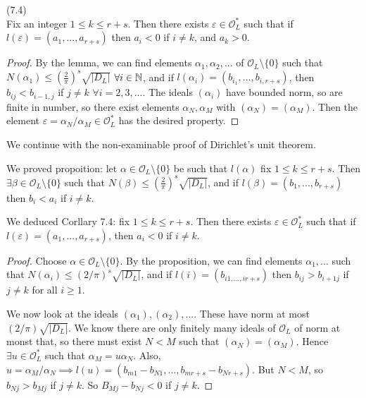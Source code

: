 \documentclass[a4paper]{article}
\begin{document}
\begin{coro} (7.4)\\
Fix an integer $1 \leq k \leq r+s$. Then there exists $\varepsilon \in \mathcal{O}_L^*$ such that if $l(\varepsilon) = (a_1,...,a_{r+s})$ then $a_i < 0$ if $i \neq k$, and $a_k > 0$.
\begin{proof}
By the lemma, we can find elements $\alpha_1,\alpha_2,...$ of $\mathcal{O}_L\setminus \{0\}$ such that $N(\alpha_1) \leq (\frac{2}{\pi})^s \sqrt{|D_L|}$ $\forall i \in \mathbb{N}$, and if $l(\alpha_i) = (b_{i_1},...,b_{i,r+s})$, then $b_{ij} < b_{i-1,j}$ if $j \neq k$ $\forall i = 2,3,...$. The ideals $(\alpha_i)$ have bounded norm, so are finite in number, so there exist elements $\alpha_N, \alpha_M$ with $(\alpha_N) = (\alpha_M)$. Then the element $\varepsilon = \alpha_N/\alpha_M \in \mathcal{O}_L^*$ has the desired property.
\end{proof}
\end{coro}

We continue with the non-examinable proof of Dirichlet's unit theorem.

We proved propoition: let $\alpha \in \mathcal{O}_L \setminus \{0\}$ be such that $l(\alpha)$ fix $1 \leq k \leq r+s$. Then $\exists \beta \in \mathcal{O}_L \setminus \{0\}$ such that $N(\beta) \leq (\frac{2}{\pi})^s \sqrt{|D_L|}$, and if $l(\beta) = (b_1,...,b_{r+s})$ then $b_i < a_i$ if $i \neq k$.

We deduced Corllary 7.4: fix $1 \leq k \leq r+s$. Then there exists $\varepsilon \in \mathcal{O}_L^*$ such that if $l(\varepsilon) = (a_1,...,a_{r+s})$, then $a_i < 0$ if $i \neq k$.
\begin{proof}
Choose $\alpha \in \mathcal{O}_L \setminus \{0\}$. By the proposition, we can find elements $\alpha_1,...$ such that $N(\alpha_i) \leq (2/\pi)^s \sqrt{|D_L|}$, and if $l(i) = (b_{i1,...,ir+s})$ then $b_{ij} > b_{i+1j}$ if $j \neq k$ for all $i \geq 1$.

We now look at the ideals $(\alpha_1),(\alpha_2),...$. These have norm at most $(2/\pi)\sqrt{|D_L|}$. We know there are only finitely many ideals of $\mathcal{O}_L$ of norm at monst that, so there must exist $N<M$ such that $(\alpha_N) = (\alpha_M)$. Hence $\exists u \in \mathcal{O}_L^*$ such that $\alpha_M = u \alpha_N$. Also, $u = \alpha_M / \alpha_N \implies l(u) = (b_{m1}-b_{N1},...,b_{mr+s}-b_{Nr+s})$. But $N<M$, so $b_{Nj} > b_{Mj}$ if $j \neq k$. So $B_{Mj} - b_{Nj} < 0$ if $j \neq k$.
\end{proof}
\end{document}
